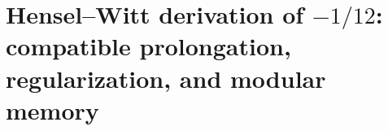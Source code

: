 \HMTFlushCurrentChapter
\chapter{Hensel--Witt derivation of \texorpdfstring{\(-1/12\)}{-1/12}: compatible prolongation, regularization, and modular memory}%
\begingroup
\renewcommand{\chapter}[2][]{}%
%
\endgroup

\HMTFlushCurrentChapter
\chapter{Determinantal derivation of the absolute action scale: Smith normal form, cokernel of order \(16\) and valuation \texorpdfstring{\(10^{-34}\)}{10^-34}}%
\begingroup
\renewcommand{\chapter}[2][]{}%
%
\endgroup


\HMTFlushCurrentChapter
\chapter{Regional character of degree \(5\), construction of \texorpdfstring{\(\eta_{\mathrm{ret}}\)}{eta ret} and positive action measure on the emission quotient}%
\begingroup
\renewcommand{\chapter}[2][]{}%
%
\endgroup


\HMTFlushCurrentChapter
\chapter{Self-dual derivation of the Planck constant and its action line: temporal periodicity of \(108\) phases, Compton closure and bidirectional covariance}%
\begingroup
\renewcommand{\chapter}[2][]{}%
%
\endgroup


